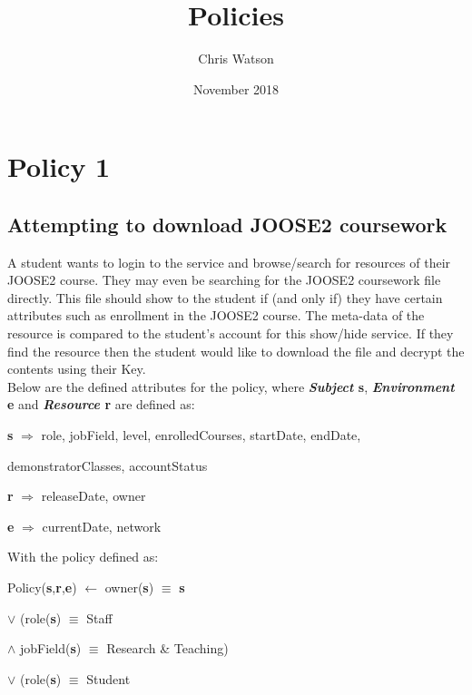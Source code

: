 \documentclass[a4paper,11pt]{article}
\title{Policies}
\author{Chris Watson}
\date{November 2018}
\begin{document}
\maketitle

\setcounter{secnumdepth}{1}

\section{Policy 1}
\subsection{Attempting to download JOOSE2 coursework}
A student wants to login to the service and browse/search for resources of their JOOSE2 course. They may even be searching for the JOOSE2 coursework file directly. This file should show to the student if (and only if) they have certain attributes such as enrollment in the JOOSE2 course. The meta-data of the resource is compared to the student's account for this show/hide service. If they find the resource then the student would like to download the file and decrypt the contents using their Key.\\
Below are the defined attributes for the policy, where \textbf{\emph{Subject} s}, \textbf{\emph{Environment} e} and \textbf{\emph{Resource} r} are defined as:\\\par
\textbf{s} $\Rightarrow$ role, jobField, level, enrolledCourses, startDate, endDate,\par
\hspace{0.8cm}demonstratorClasses, accountStatus\par
\textbf{r} $\Rightarrow$ releaseDate, owner\par
\textbf{e} $\Rightarrow$ currentDate, network\\\par
\noindent With the policy defined as:\\\par
Policy(\textbf{s},\textbf{r},\textbf{e}) $\leftarrow$ owner(\textbf{s}) $\equiv$ \textbf{s}\par
\hspace{2.3cm}$\vee{}$ (role(\textbf{s}) $\equiv$ Staff\par
\hspace{2.8cm}$\wedge{}$ jobField(\textbf{s}) $\equiv$ Research \& Teaching)\par
\hspace{2.3cm}$\vee{}$ (role(\textbf{s}) $\equiv$ Student\par
\end{document}
